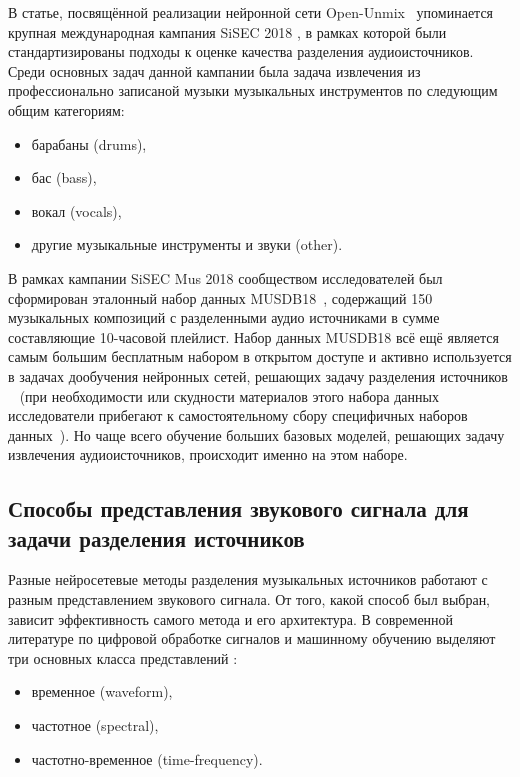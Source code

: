 \documentclass[14pt]{extarticle}
\begin{document}
\par В статье, посвящённой реализации нейронной сети Open-Unmix~\cite{openunmix} упоминается крупная международная
кампания SiSEC 2018 \cite{sigsep_camp, sigsep_camp2}, в рамках которой были стандартизированы подходы к оценке качества
разделения аудиоисточников. Среди основных задач данной кампании была задача извлечения из профессионально записаной музыки 
музыкальных инструментов по следующим общим категориям:
\begin{itemize}[label=$\bullet$, wide]
\item барабаны (drums),
\item бас (bass),
\item вокал (vocals),
\item другие музыкальные инструменты и звуки (other).
\end{itemize}

В рамках кампании SiSEC Mus 2018 сообществом исследователей был сформирован эталонный набор данных MUSDB18~\cite{MUSDB18}, 
содержащий 150 музыкальных композиций с разделенными аудио источниками в сумме составляющие 
10-часовой плейлист. 
Набор данных MUSDB18 всё ещё является самым большим бесплатным 
набором в открытом доступе и активно используется в задачах дообучения нейронных 
сетей, решающих задачу разделения источников ~\cite{waveform_domain} (при необходимости или скудности 
материалов этого набора данных исследователи прибегают к самостоятельному сбору специфичных наборов данных~\cite{MUSDB18_dop}).
Но чаще всего обучение больших базовых моделей, решающих задачу извлечения аудиоисточников, происходит именно на этом наборе.

\subsection{Способы представления звукового сигнала для задачи разделения источников}
Разные нейросетевые методы разделения музыкальных источников работают с разным представлением звукового сигнала. От того, какой
способ был выбран, зависит эффективность самого метода и его архитектура.
В современной литературе по цифровой обработке сигналов и машинному обучению выделяют три основных класса представлений \cite{stft_1977, hyb_spectr}:
\begin{itemize}[label=$\bullet$, wide]
	\item временное (waveform),
	\item частотное (spectral),
	\item частотно-временное (time-frequency).
\end{itemize}
\end{document}
